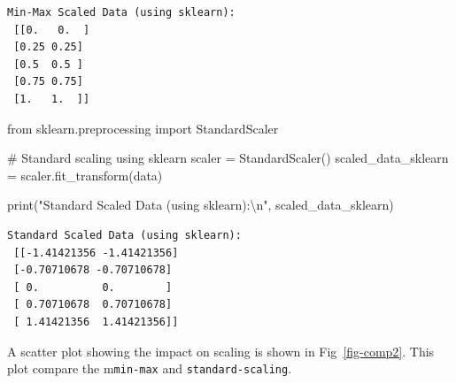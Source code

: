 \documentclass[
  letterpaper,
  DIV=11,
  numbers=noendperiod]{scrreprt}
\newenvironment{Shaded}{\begin{snugshade}}{\end{snugshade}}
\newcommand{\BuiltInTok}[1]{\textcolor[rgb]{0.00,0.23,0.31}{#1}}
\newcommand{\CharTok}[1]{\textcolor[rgb]{0.13,0.47,0.30}{#1}}
\newcommand{\CommentTok}[1]{\textcolor[rgb]{0.37,0.37,0.37}{#1}}
\newcommand{\ImportTok}[1]{\textcolor[rgb]{0.00,0.46,0.62}{#1}}
\newcommand{\NormalTok}[1]{\textcolor[rgb]{0.00,0.23,0.31}{#1}}
\newcommand{\OperatorTok}[1]{\textcolor[rgb]{0.37,0.37,0.37}{#1}}
\newcommand{\StringTok}[1]{\textcolor[rgb]{0.13,0.47,0.30}{#1}}
\theoremstyle{plain}
\theoremstyle{definition}
\theoremstyle{remark}
\begin{document}
\begin{verbatim}
Min-Max Scaled Data (using sklearn):
 [[0.   0.  ]
 [0.25 0.25]
 [0.5  0.5 ]
 [0.75 0.75]
 [1.   1.  ]]
\end{verbatim}

\begin{Shaded}
\begin{Highlighting}[]
\ImportTok{from}\NormalTok{ sklearn.preprocessing }\ImportTok{import}\NormalTok{ StandardScaler}

\CommentTok{\# Standard scaling using sklearn}
\NormalTok{scaler }\OperatorTok{=}\NormalTok{ StandardScaler()}
\NormalTok{scaled\_data\_sklearn }\OperatorTok{=}\NormalTok{ scaler.fit\_transform(data)}

\BuiltInTok{print}\NormalTok{(}\StringTok{"Standard Scaled Data (using sklearn):}\CharTok{\textbackslash{}n}\StringTok{"}\NormalTok{, scaled\_data\_sklearn)}
\end{Highlighting}
\end{Shaded}

\begin{verbatim}
Standard Scaled Data (using sklearn):
 [[-1.41421356 -1.41421356]
 [-0.70710678 -0.70710678]
 [ 0.          0.        ]
 [ 0.70710678  0.70710678]
 [ 1.41421356  1.41421356]]
\end{verbatim}

A scatter plot showing the impact on scaling is shown in
Fig~\ref{fig-comp2}. This plot compare the m\texttt{min-max} and
\texttt{standard-scaling}.
\end{document}
